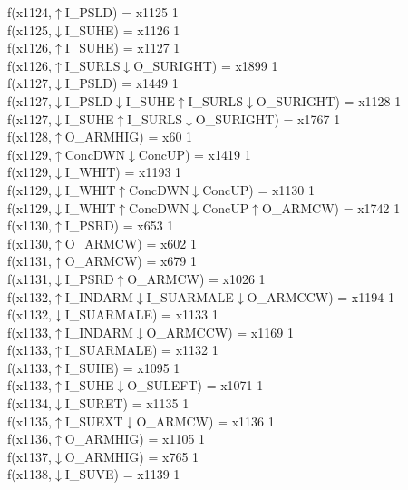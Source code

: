 f(x1124,$\uparrow$I\_PSLD) = x1125 {1} \\
f(x1125,$\downarrow$I\_SUHE) = x1126 {1} \\
f(x1126,$\uparrow$I\_SUHE) = x1127 {1} \\
f(x1126,$\uparrow$I\_SURLS$\downarrow$O\_SURIGHT) = x1899 {1} \\
f(x1127,$\downarrow$I\_PSLD) = x1449 {1} \\
f(x1127,$\downarrow$I\_PSLD$\downarrow$I\_SUHE$\uparrow$I\_SURLS$\downarrow$O\_SURIGHT) = x1128 {1} \\
f(x1127,$\downarrow$I\_SUHE$\uparrow$I\_SURLS$\downarrow$O\_SURIGHT) = x1767 {1} \\
f(x1128,$\uparrow$O\_ARMHIG) = x60 {1} \\
f(x1129,$\uparrow$ConcDWN$\downarrow$ConcUP) = x1419 {1} \\
f(x1129,$\downarrow$I\_WHIT) = x1193 {1} \\
f(x1129,$\downarrow$I\_WHIT$\uparrow$ConcDWN$\downarrow$ConcUP) = x1130 {1} \\
f(x1129,$\downarrow$I\_WHIT$\uparrow$ConcDWN$\downarrow$ConcUP$\uparrow$O\_ARMCW) = x1742 {1} \\
f(x1130,$\uparrow$I\_PSRD) = x653 {1} \\
f(x1130,$\uparrow$O\_ARMCW) = x602 {1} \\
f(x1131,$\uparrow$O\_ARMCW) = x679 {1} \\
f(x1131,$\downarrow$I\_PSRD$\uparrow$O\_ARMCW) = x1026 {1} \\
f(x1132,$\uparrow$I\_INDARM$\downarrow$I\_SUARMALE$\downarrow$O\_ARMCCW) = x1194 {1} \\
f(x1132,$\downarrow$I\_SUARMALE) = x1133 {1} \\
f(x1133,$\uparrow$I\_INDARM$\downarrow$O\_ARMCCW) = x1169 {1} \\
f(x1133,$\uparrow$I\_SUARMALE) = x1132 {1} \\
f(x1133,$\uparrow$I\_SUHE) = x1095 {1} \\
f(x1133,$\uparrow$I\_SUHE$\downarrow$O\_SULEFT) = x1071 {1} \\
f(x1134,$\downarrow$I\_SURET) = x1135 {1} \\
f(x1135,$\uparrow$I\_SUEXT$\downarrow$O\_ARMCW) = x1136 {1} \\
f(x1136,$\uparrow$O\_ARMHIG) = x1105 {1} \\
f(x1137,$\downarrow$O\_ARMHIG) = x765 {1} \\
f(x1138,$\downarrow$I\_SUVE) = x1139 {1} \\

